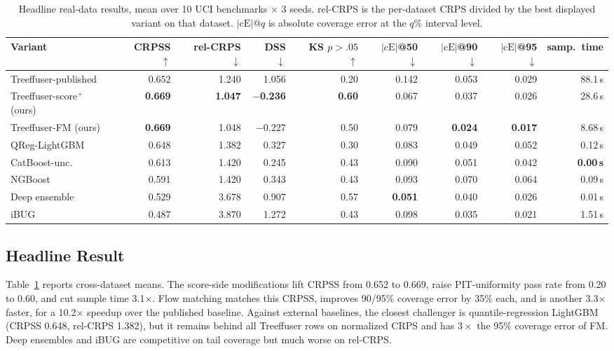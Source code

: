 \documentclass{uai2026}
\begin{document}
\begin{table}[!t]
  \centering
  \caption{Headline real-data results, mean over 10 UCI benchmarks $\times$ 3 seeds. rel-CRPS is the per-dataset CRPS divided by the best displayed variant on that dataset. $|\text{cE}|$@$q$ is absolute coverage error at the $q$\% interval level.}\label{tab:headline}
  \scriptsize
  \begin{tabular}{lrrrrrrrr}
    \toprule
    Variant & CRPSS $\uparrow$ & rel-CRPS $\downarrow$ & DSS $\downarrow$ & KS $p{>}.05$ $\uparrow$ & $|\text{cE}|$@50 $\downarrow$ & $|\text{cE}|$@90 $\downarrow$ & $|\text{cE}|$@95 $\downarrow$ & samp.\ time \\
    \midrule
    Treeffuser-published & 0.652 & 1.240 & 1.056 & 0.20 & 0.142 & 0.053 & 0.029 & 88.1\,s \\
    Treeffuser-score$^+$ (ours) & \textbf{0.669} & \textbf{1.047} & \textbf{$-$0.236} & \textbf{0.60} & 0.067 & 0.037 & 0.026 & 28.6\,s \\
    Treeffuser-FM (ours) & \textbf{0.669} & 1.048 & $-$0.227 & 0.50 & 0.079 & \textbf{0.024} & \textbf{0.017} & 8.68\,s \\
    \midrule
    QReg-LightGBM & 0.648 & 1.382 & 0.327 & 0.30 & 0.083 & 0.049 & 0.052 & 0.12\,s \\
    CatBoost-unc. & 0.613 & 1.420 & 0.245 & 0.43 & 0.090 & 0.051 & 0.042 & \textbf{0.00\,s} \\
    NGBoost & 0.591 & 1.420 & 0.343 & 0.43 & 0.093 & 0.070 & 0.064 & 0.09\,s \\
    Deep ensemble & 0.529 & 3.678 & 0.907 & 0.57 & \textbf{0.051} & 0.040 & 0.026 & 0.01\,s \\
    iBUG & 0.487 & 3.870 & 1.272 & 0.43 & 0.098 & 0.035 & 0.021 & 1.51\,s \\
    \bottomrule
  \end{tabular}
\end{table}

\subsection{Headline Result}\label{sec:headline}
Table~\ref{tab:headline} reports cross-dataset means. The score-side modifications lift CRPSS from 0.652 to 0.669, raise PIT-uniformity pass rate from 0.20 to 0.60, and cut sample time 3.1$\times$. Flow matching matches this CRPSS, improves 90/95\% coverage error by 35\% each, and is another 3.3$\times$ faster, for a 10.2$\times$ speedup over the published baseline. Against external baselines, the closest challenger is quantile-regression LightGBM (CRPSS 0.648, rel-CRPS 1.382), but it remains behind all Treeffuser rows on normalized CRPS and has $3\times$ the 95\% coverage error of FM. Deep ensembles and iBUG are competitive on tail coverage but much worse on rel-CRPS.
\end{document}
